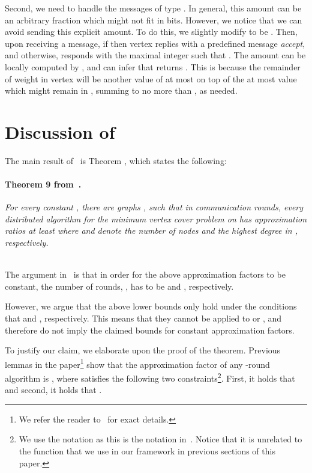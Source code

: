 \documentclass[11pt]{article}
\begin{document}
Second, we need to handle the messages of type . In general, this amount can be an arbitrary fraction which might not fit in  bits. However, we notice that we can avoid sending this explicit amount. To do this, we slightly modify  to be . Then, upon receiving a  message, if  then vertex  replies with a predefined message \emph{accept}, and otherwise,  responds with the maximal integer  such that . The amount  can be locally computed by , and  can infer that  returns . This is because the remainder of weight in vertex  will be another value of at most  on top of the at most  value which might remain in , summing to no more than , as needed.

\section{Discussion of~\cite{KMW10}}
\label{sec:refutation}
The main result of~\cite{KMW10} is Theorem , which states the following:

\paragraph{Theorem 9 from~\cite{KMW10}.}
\textit{
For every constant , there are graphs , such that in  communication rounds, every distributed algorithm for the minimum vertex cover problem on  has approximation ratios at least 
where  and  denote the number of nodes and the highest degree in , respectively.
}

~\\

The argument in~\cite{KMW10} is that in order for the above approximation factors to be constant, the number of rounds, , has to be  and , respectively.

However, we argue that the above lower bounds only hold under the conditions that  and , respectively. This means that they cannot be applied to  or , and therefore do not imply the claimed bounds for constant approximation factors.

To justify our claim, we elaborate upon the proof of the theorem.
Previous lemmas in the paper\footnote{We refer the reader to~\cite{KMW10} for exact details.} show that the approximation factor of any -round algorithm is , where  satisfies the following two constraints\footnote{We use the notation  as this is the notation in~\cite{KMW10}. Notice that it is unrelated to the function  that we use in our framework in previous sections of this paper.}. First, it holds that  and second, it holds that .
\end{document}
